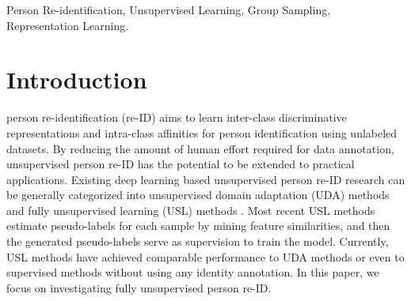 \documentclass[lettersize,journal]{IEEEtran}
\begin{document}
\begin{IEEEkeywords}
Person Re-identification, Unsupervised Learning, Group Sampling, Representation Learning.
\end{IEEEkeywords}






\IEEEpeerreviewmaketitle



\section{Introduction} \label{sec:introduction}


 person re-identification (re-ID) aims to learn inter-class discriminative representations and intra-class affinities for person identification using unlabeled datasets. 
By reducing the amount of human effort required for data annotation, unsupervised person re-ID has the potential to be extended to practical applications.
Existing deep learning based unsupervised person re-ID research can be generally categorized into unsupervised domain adaptation (UDA) methods \cite{PTGAN,eSPGAN,HHL,SSG,MAR,MEB,CR-GAN,MMT,Ad-cluster,zj1,DG-Net++,tip-uda1,tip-uda2,tip-uda3,tip-uda4,tip-uda5,HCD,JVCT,GCL} and fully unsupervised learning (USL) methods \cite{LOMO,Market,OIM,BUC,DBC,tip-u1,SSL,MMCL,HCT,SpCL,CAP,ICE,DSCE,IICS,MPRD,CycAs,tip-u2}. 
Most recent USL methods~\cite{SpCL,ICE,CAP} estimate pseudo-labels for each sample by mining feature similarities, and then the generated pseudo-labels serve as supervision to train the model.
Currently, USL methods have achieved comparable performance to UDA methods or even to supervised methods without using any identity annotation.
In this paper, we focus on investigating fully unsupervised person re-ID.
\end{document}
